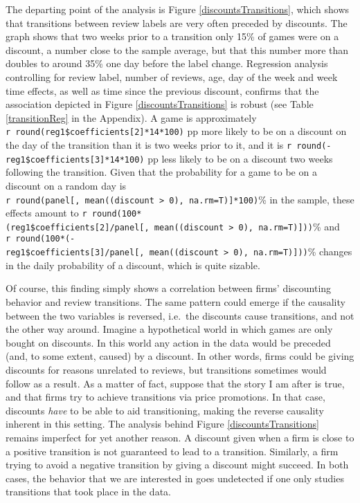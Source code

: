 \documentclass[
  12pt,
  pagebackref]{article}
\begin{document}
The departing point of the analysis is Figure
\ref{discountsTransitions}, which shows that transitions between review
labels are very often preceded by discounts. The graph shows that two
weeks prior to a transition only 15\% of games were on a discount, a
number close to the sample average, but that this number more than
doubles to around 35\% one day before the label change. Regression
analysis controlling for review label, number of reviews, age, day of
the week and week time effects, as well as time since the previous
discount, confirms that the association depicted in Figure
\ref{discountsTransitions} is robust (see Table \ref{transitionReg} in
the Appendix). A game is approximately
\texttt{r\ round(reg1\$coefficients{[}2{]}*14*100)} pp more likely to be
on a discount on the day of the transition than it is two weeks prior to
it, and it is \texttt{r\ round(-reg1\$coefficients{[}3{]}*14*100)} pp
less likely to be on a discount two weeks following the transition.
Given that the probability for a game to be on a discount on a random
day is
\texttt{r\ round(panel{[},\ mean((discount\ \textgreater{}\ 0),\ na.rm=T){]}*100)}\%
in the sample, these effects amount to
\texttt{r\ round(100*(reg1\$coefficients{[}2{]}/panel{[},\ mean((discount\ \textgreater{}\ 0),\ na.rm=T){]}))}\%
and
\texttt{r\ round(100*(-reg1\$coefficients{[}3{]}/panel{[},\ mean((discount\ \textgreater{}\ 0),\ na.rm=T){]}))}\%
changes in the daily probability of a discount, which is quite sizable.

Of course, this finding simply shows a correlation between firms'
discounting behavior and review transitions. The same pattern could
emerge if the causality between the two variables is reversed, i.e.~the
discounts cause transitions, and not the other way around. Imagine a
hypothetical world in which games are only bought on discounts. In this
world any action in the data would be preceded (and, to some extent,
caused) by a discount. In other words, firms could be giving discounts
for reasons unrelated to reviews, but transitions sometimes would follow
as a result. As a matter of fact, suppose that the story I am after is
true, and that firms try to achieve transitions via price promotions. In
that case, discounts \emph{have} to be able to aid transitioning, making
the reverse causality inherent in this setting. The analysis behind
Figure \ref{discountsTransitions} remains imperfect for yet another
reason. A discount given when a firm is close to a positive transition
is not guaranteed to lead to a transition. Similarly, a firm trying to
avoid a negative transition by giving a discount might succeed. In both
cases, the behavior that we are interested in goes undetected if one
only studies transitions that took place in the data.
\end{document}
